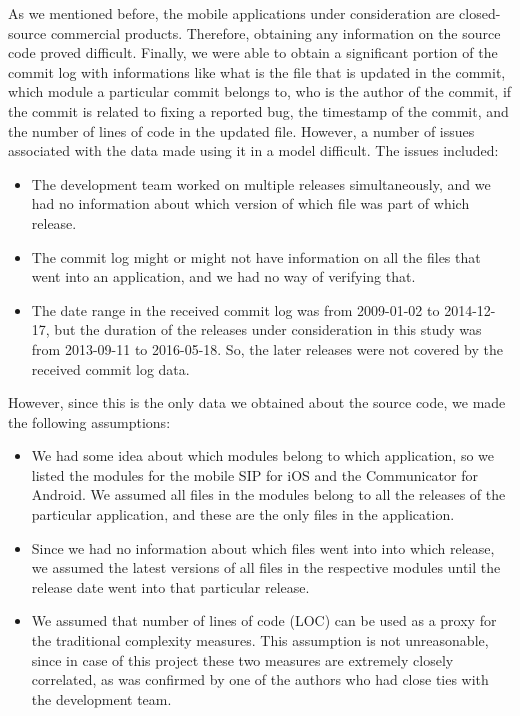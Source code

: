 \documentclass[smallcondensed]{svjour3}     %
\begin{document}
As we mentioned before, the mobile applications under consideration are closed-source commercial products. Therefore, obtaining any information on the source code proved difficult. Finally, we were able to obtain a significant portion of the commit log with informations like what is the file that is updated in the commit, which module a particular commit belongs to, who is the author of the commit, if the commit is related to fixing a reported bug, the timestamp of the commit, and the number of lines of code in the updated file. However, a number of issues associated with the data made using it in a model difficult. The issues included:
\begin{itemize}
\item The development team worked on multiple releases simultaneously, and we had no information about which version of which file was part of which release.
\item The commit log might or might not have information on all the files that went into an application, and we had no way of verifying that.
\item The date range in the received commit log was from 2009-01-02 to 2014-12-17, but the duration of the releases under consideration in this study was from 2013-09-11 to 2016-05-18. So, the later releases were not covered by the received commit log data.
\end{itemize}

However, since this is the only data we obtained about the source code, we made the following assumptions:

\begin{itemize}
\item We had some idea about which modules belong to which application, so we listed the modules for the mobile SIP for iOS and the Communicator for Android. We assumed all files in the modules belong to all the releases of the particular application, and these are the only files in the application.
\item Since we had no information about which files went into into which release, we assumed the latest versions of all files in the respective modules until the release date went into that particular release.
\item We assumed that number of lines of code (LOC) can be used as a proxy for the traditional complexity measures. This assumption is not unreasonable, since in case of this project these two measures are extremely closely correlated, as was confirmed by one of the authors who had close ties with the development team.
\end{itemize}
\end{document}
